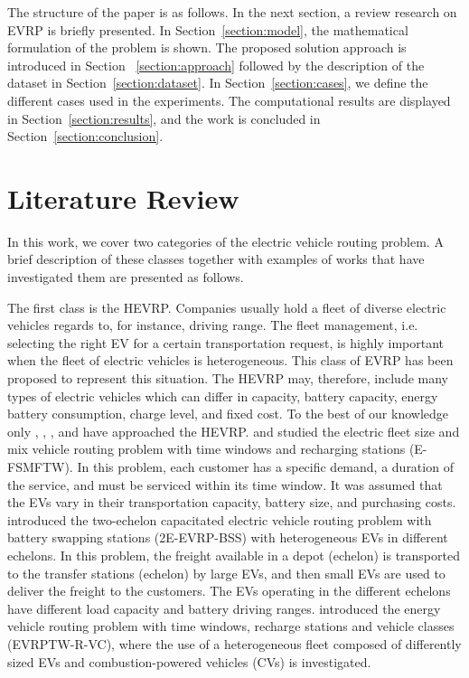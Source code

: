 \documentclass[11pt]{article}
\begin{document}
The structure of the paper is as follows. In the next section, a review research on EVRP is briefly presented. In Section~\ref{section:model}, the mathematical formulation of the problem is shown. The proposed solution approach is introduced in Section ~\ref{section:approach} followed by the description of the dataset in Section~\ref{section:dataset}. In Section~\ref{section:cases}, we define the different cases used in the experiments. The computational results are displayed in Section~\ref{section:results}, and the work is concluded in Section~\ref{section:conclusion}.

\section{Literature Review}
In this work, we cover two categories of the electric vehicle routing problem. A brief description of these classes together with examples of works that have investigated them are presented as follows. 

The first class is the HEVRP. Companies usually hold a fleet of diverse electric vehicles regards to, for instance, driving range. The fleet management, i.e. selecting the right EV for a certain transportation request, is highly important when the fleet of electric vehicles is heterogeneous. This class of EVRP has been proposed to represent this situation. The HEVRP may, therefore, include many types of electric vehicles which can differ in capacity, battery capacity, energy battery consumption, charge level, and fixed cost. To the best of our knowledge only \cite{Hiermann2016}, \cite{Penha2016}, \cite{Jie2019}, and \cite{Kopfer2019} have approached the HEVRP. \cite{Hiermann2016} and \cite{Penha2016} studied the electric fleet size and mix vehicle routing problem with time windows and recharging stations (E-FSMFTW). In this problem, each customer has a specific demand, a duration of the service, and must be serviced within its time window. It was assumed that the EVs vary in their transportation capacity, battery size, and purchasing costs. \cite{Jie2019} introduced the two-echelon capacitated electric vehicle routing problem with battery swapping stations (2E-EVRP-BSS) with heterogeneous EVs in different echelons. In this problem, the freight available in a depot (echelon) is transported to the transfer stations (echelon) by large EVs, and then small EVs are used to deliver the freight to the customers. The EVs operating in the different echelons have different load capacity and battery driving ranges. \cite{Kopfer2019} introduced the energy vehicle routing problem with time windows, recharge stations and vehicle classes (EVRPTW-R-VC), where the use of a heterogeneous fleet composed of differently sized EVs and combustion-powered vehicles (CVs) is investigated. 
\end{document}

